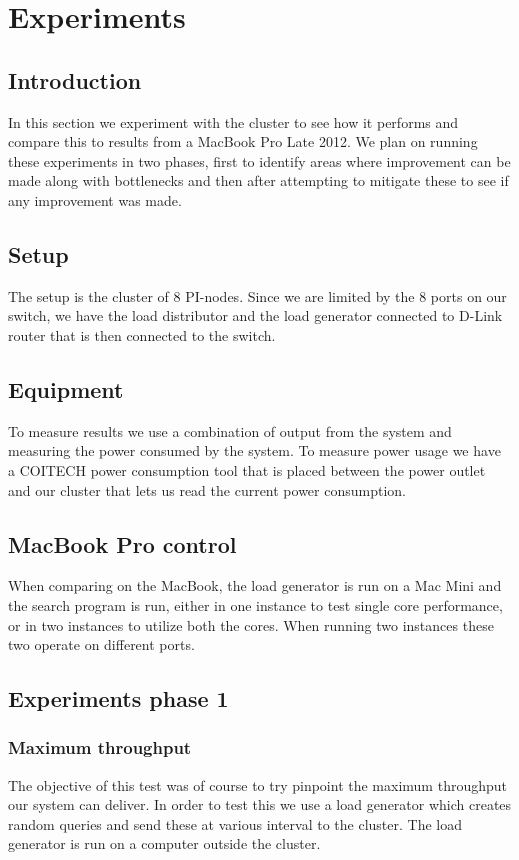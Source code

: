 
\clearpage
\section{Experiments}

\subsection{Introduction}
In this section we experiment with the cluster to see how it performs and compare this to results from a MacBook Pro Late 2012. We plan on running these experiments in two phases, first to identify areas where improvement can be made along with bottlenecks and then after attempting to mitigate these to see if any improvement was made.

\subsection{Setup}
The setup is the cluster of 8 PI-nodes. Since we are limited by the 8 ports on our switch, we have the load distributor and the load generator connected to D-Link router that is then connected to the switch. 

\subsection{Equipment}
To measure results we use a combination of output from the system and measuring the power consumed by the system. To measure power usage we have a COITECH power consumption tool that is placed between the power outlet and our cluster that lets us read the current power consumption.

\subsection{MacBook Pro control}
When comparing on the MacBook, the load generator is run on a Mac Mini and the search program is run, either in one instance to test single core performance, or in two instances to utilize both the cores. When running two instances these two operate on different ports.  

\subsection{Experiments phase 1}

\subsubsection{Maximum throughput} 
The objective of this test was of course to try pinpoint the maximum throughput our system can deliver. In order to test this we use a load generator which creates random queries and send these at various interval to the cluster. The load generator is run on a computer outside the cluster. 

